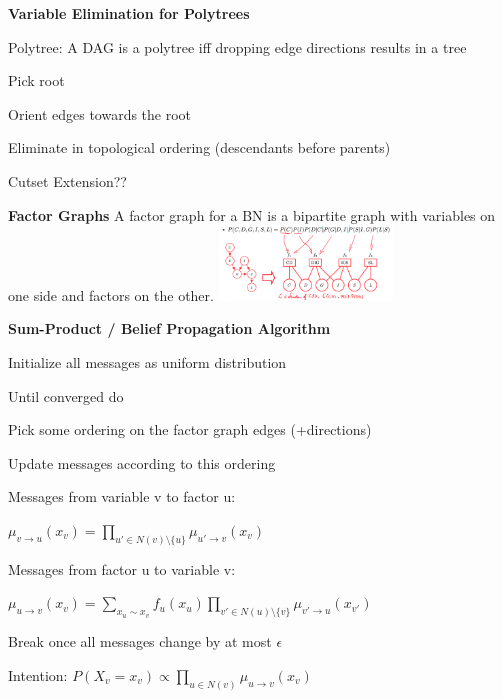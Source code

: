 \documentclass[a4paper, 11pt, landscape]{article}
\begin{document}
\begin{multicols*}{3}
\begin{compactitem}
	\end{compactitem}

		
	\textbf{Variable Elimination for Polytrees}
	
	Polytree: A DAG is a polytree iff dropping edge directions results in a tree
	\begin{compactitem}
		\item Pick root
		\item Orient edges towards the root
		\item Eliminate in topological ordering (descendants before parents)
	\end{compactitem}

	Cutset Extension??
	
	\textbf{Factor Graphs}
	A factor graph for a BN is a bipartite graph with variables on one side and  factors on the other.
	\includegraphics[height=2cm]{img/pai2.png}
	
	\textbf{Sum-Product / Belief Propagation Algorithm}	
	
	\begin{compactitem}
		\item Initialize all messages as uniform distribution  
		\item Until converged do
		\begin{compactenum}
			\item Pick some ordering on the factor graph edges (+directions)   
			\item Update messages according to this ordering
			
			Messages from variable v to factor u: 
			
			$\mu_{v \rightarrow u}(x_v) = \prod_{u' \in N(v) \setminus \{u\}} \mu_{u' \rightarrow v}(x_{v})$ 
			
			Messages from factor u to variable v:
			
			$\mu_{u \rightarrow v}(x_v) = \sum_{x_u \sim x_v } f_u(x_u) \prod_{v' \in N(u) \setminus \{v\}} \mu_{v' \rightarrow u}(x_{v'})$ 

			\item Break once all messages change by at most $\epsilon$
		\end{compactenum}
	\end{compactitem}

	Intention: $P(X_v = x_v) \propto \prod_{u \in N(v)} \mu_{u \rightarrow v} (x_v)$
	

\end{multicols*}
\end{document}
